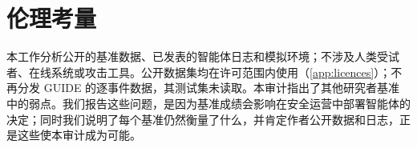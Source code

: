 \section*{伦理考量}
本工作分析公开的基准数据、已发表的智能体日志和模拟环境；不涉及人类受试者、在线系统或攻击工具。公开数据集均在许可范围内使用（\cref{app:licences}）；不再分发 GUIDE 的逐事件数据，其测试集未读取。本审计指出了其他研究者基准中的弱点。我们报告这些问题，是因为基准成绩会影响在安全运营中部署智能体的决定；同时我们说明了每个基准仍然衡量了什么，并肯定作者公开数据和日志，正是这些使本审计成为可能。
